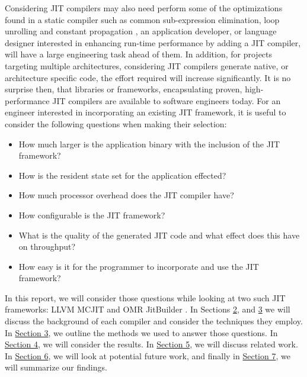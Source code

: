 Considering JIT compilers may also need perform some of the optimizations found in a static compiler such as common sub-expression elimination, loop unrolling and constant propagation \cite{compilerBook}, an application developer, or language designer interested in enhancing run-time performance by adding a JIT compiler, will have a large engineering task ahead of them.
In addition, for projects targeting multiple architectures, considering JIT compilers generate native, or architecture specific code, the effort required will increase significantly.
It is no surprise then, that libraries or frameworks, encapsulating proven, high-performance JIT compilers are available to software engineers today.
For an engineer interested in incorporating an existing JIT framework, it is useful to consider the following questions when making their selection: 
\begin{itemize}
    \item How much larger is the application binary with the inclusion of the JIT framework?
    \item How is the resident state set for the application effected?
    \item How much processor overhead does the JIT compiler have?
    \item How configurable is the JIT framework?
    \item What is the quality of the generated JIT code and what effect does this have on throughput?
    \item How easy is it for the programmer to incorporate and use the JIT framework?
\end{itemize} 

In this report, we will consider those questions while looking at two such JIT frameworks: LLVM MCJIT \cite{LLVM_Web} and OMR JitBuilder \cite{jitbuilderPaper}.
In Sections \hyperref[sec:llvm]{2}, and \hyperref[sec:jitbuilder]{3} we will discuss the background of each compiler and consider the techniques they employ.
In \hyperref[sec:methodology]{Section 3}, we outline the methods we used to answer those questions.
In \hyperref[sec:results]{Section 4}, we will consider the results.
In \hyperref[sec:related-work]{Section 5}, we will discuss related work.
In \hyperref[sec:future-work]{Section 6}, we will look at potential future work, and finally in \hyperref[sec:summary]{Section 7}, we will summarize our findings.